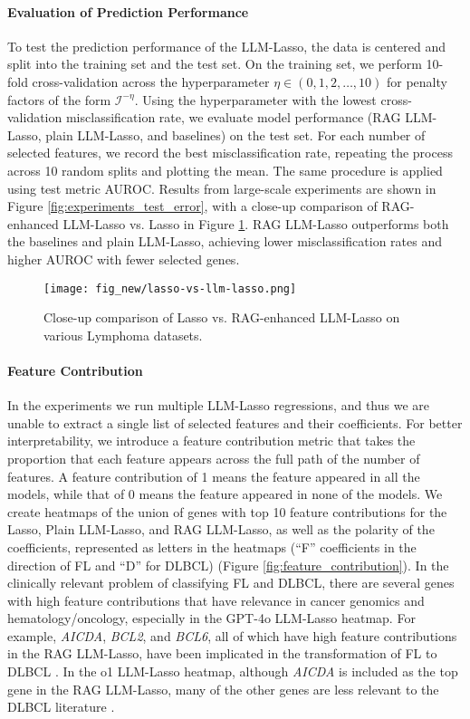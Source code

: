 \paragraph{Evaluation of Prediction Performance}\label{para:prediction_perf}
To test the prediction performance of the LLM-Lasso, the data is centered and split into the training set and the test set. On the training set, we perform 10-fold cross-validation across the hyperparameter $\eta \in (0,1, 2, \ldots, 10)$ for penalty factors of the form $\mathcal{I}^{-\eta}$. Using the hyperparameter with the lowest cross-validation misclassification rate, we evaluate model performance (RAG LLM-Lasso, plain LLM-Lasso, and baselines) on the test set. For each number of selected features, we record the best misclassification rate, repeating the process across 10 random splits and plotting the mean. The same procedure is applied using test metric AUROC.
Results from large-scale experiments are shown in Figure \ref{fig:experiments_test_error}, with a close-up comparison of RAG-enhanced LLM-Lasso vs. Lasso in Figure \ref{fig:lasso_comp}. RAG LLM-Lasso outperforms both the baselines and plain LLM-Lasso, achieving lower misclassification rates and higher AUROC with fewer selected genes.
\begin{figure}[h]
    \centering    \texttt{[image: fig\_new/lasso-vs-llm-lasso.png]}
    \vspace{-1.5em}
    \caption{Close-up comparison of Lasso vs. RAG-enhanced LLM-Lasso on various Lymphoma datasets.}
    \label{fig:lasso_comp}
\end{figure}
\paragraph{Feature Contribution}
In the experiments we run multiple LLM-Lasso regressions, and thus we are unable to extract a single list of selected features and their coefficients. For better interpretability, we introduce a feature contribution metric that takes the proportion that each feature appears across the full path of the number of features. A feature contribution of 1 means the feature appeared in all the models, while that of 0 means the feature appeared in none of the models. We create heatmaps of the union of genes with top 10 feature contributions for the Lasso, Plain LLM-Lasso, and RAG LLM-Lasso, as well as the polarity of the coefficients, represented as letters in the heatmaps (``F'' coefficients in the direction of FL and ``D'' for DLBCL) (Figure \ref{fig:feature_contribution}). In the clinically relevant problem of classifying FL and DLBCL, there are several genes with high feature contributions that have relevance in cancer genomics and hematology/oncology, especially in the GPT-4o LLM-Lasso heatmap. For example, \textit{AICDA}, \textit{BCL2}, and \textit{BCL6}, all of which have high feature contributions in the RAG LLM-Lasso, have been implicated in the transformation of FL to DLBCL \cite{lossos2004aid, green2013hierarchy}. In the o1 LLM-Lasso heatmap, although \textit{AICDA} is included as the top gene in the RAG LLM-Lasso, many of the other genes are less relevant to the DLBCL literature \cite{pasqualucci2018genetics}. 

